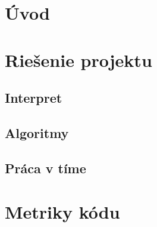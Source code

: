 \documentclass[12pt,a4paper,titlepage,final]{article}
\begin{document}

\def\author{TODO}
\def\email{xloginXX@stud.fit.vutbr.cz}
\def\projname{Interpret jazyka IFJ14}



\pagestyle{plain}
\setcounter{page}{1}
\tableofcontents

\listoftodos[Notes]

\newpage
\pagestyle{plain}
\setcounter{page}{1}

\section{Úvod} \label{uvod}


\section{Riešenie projektu} \label{riesenie}

\subsection{Interpret}

\subsection{Algoritmy}

\subsection{Práca v tíme}
\appendix

\section{Metriky kódu} \label{metriky}
\end{document}
